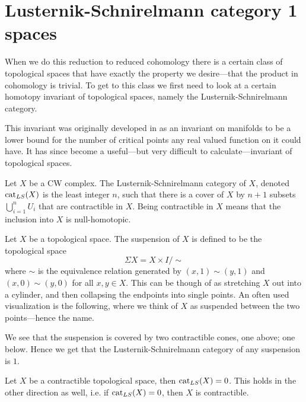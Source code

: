 \section{Lusternik-Schnirelmann category 1 spaces}

When we do this reduction to reduced cohomology there is a certain class of topological spaces that have exactly the property we desire---that the product in cohomology is trivial. To get to this class we first need to look at a certain homotopy invariant of topological spaces, namely the Lusternik-Schnirelmann category. 

This invariant was originally developed in \cite{lscat} as an invariant on manifolds to be a lower bound for the number of critical points any real valued function on it could have. It has since become a useful---but very difficult to calculate---invariant of topological spaces. 

\begin{definition}
\label{def:ls_category}
Let $X$ be a CW complex. The Lusternik-Schnirelmann category of $X$, denoted $\text{cat}_{LS}(X)$ is the least integer $n$, such that there is a cover of $X$ by $n+1$ subsets $\bigcup_{i=1}^n U_i$ that are contractible in $X$. Being contractible in $X$ means that the inclusion into $X$ is null-homotopic. 
\end{definition}

\begin{example}
\label{ex:suspension}
Let $X$ be a topological space. The suspension of $X$ is defined to be the topological space
\begin{equation*}
	\Sigma X = X\times I/\sim
\end{equation*}
where $\sim$ is the equivalence relation generated by $(x,1)\sim (y,1)$ and $(x,0)\sim (y,0)$ for all $x,y\in X$. This can be though of as stretching $X$ out into a cylinder, and then collapsing the endpoints into single points. An often used visualization is the following, where we think of $X$ as suspended between the two points---hence the name.
\begin{center}
\def\svgwidth{0.6\textwidth}

\end{center}
We see that the suspension is covered by two contractible cones, one above; one below. Hence we get that the Lusternik-Schnirelmann category of any suspension is $1$. 
\end{example}

\begin{example}
Let $X$ be a contractible topological space, then $\text{cat}_{LS}(X)=0$. This holds in the other direction as well, i.e. if $\text{cat}_{LS}(X)=0$, then $X$ is contractible.
\end{example}

